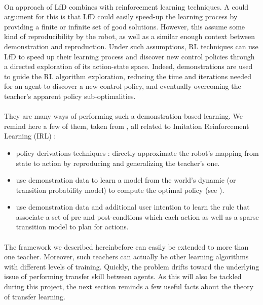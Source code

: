 \documentclass[a4paper]{report}
\begin{document}
{{{				\paragraph{} On approach of LfD combines with reinforcement learning techniques. A could argument for this is that LfD could easily speed-up the learning process by providing a finite or infinite set of good solutions. However, this assume some kind of reproducibility by the robot, as well as a similar enough context between demonstration and reproduction. \newline
				Under such assumptions, RL techniques can use LfD to speed up their learning process and discover new control policies through a directed exploration of its action-state space. Indeed, demonstrations are used to guide the RL algorithm exploration, reducing the time and iterations needed for an agent to discover a new control policy, and eventually overcoming the teacher's apparent policy sub-optimalities. 
				
				\paragraph{} They are many ways of performing such a demonstration-based learning. We remind here a few of them, taken from \cite{argall2009survey}, all related to Imitation Reinforcement Learning (IRL) : 
				\begin{itemize}
					\item policy derivations techniques : directly approximate the robot's mapping from state to action by reproducing and generalizing the teacher's one. 
					\item use demonstration data to learn a model from the world's dynamic (or transition probability model) to compute the optimal policy (see \cite{price2003accelerating}). 
					\item use demonstration data and additional user intention to learn the rule that associate a set of pre and post-condtions which each action as well as a sparse transition model to plan for actions. 
				\end{itemize}
				
				\paragraph{} The framework we described hereinbefore can easily be extended to more than one teacher. Moreover, such teachers can actually be other learning algorithms with different levels of training. Quickly, the problem drifts toward the underlying issue of performing transfer skill between agents. As this will also be tackled during this project, the next section reminds a few useful facts about the theory of transfer learning. 
			}
}}
\end{document}
